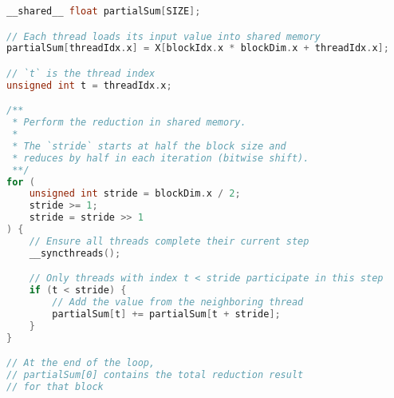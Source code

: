 \begin{lstlisting}[language=c++]
__shared__ float partialSum[SIZE];

// Each thread loads its input value into shared memory
partialSum[threadIdx.x] = X[blockIdx.x * blockDim.x + threadIdx.x];

// `t` is the thread index
unsigned int t = threadIdx.x;

/**
 * Perform the reduction in shared memory.
 *
 * The `stride` starts at half the block size and
 * reduces by half in each iteration (bitwise shift).
 **/
for (
    unsigned int stride = blockDim.x / 2;
    stride >= 1;
    stride = stride >> 1
) {
    // Ensure all threads complete their current step
    __syncthreads();

    // Only threads with index t < stride participate in this step
    if (t < stride) {
        // Add the value from the neighboring thread
        partialSum[t] += partialSum[t + stride];
    }
}

// At the end of the loop,
// partialSum[0] contains the total reduction result
// for that block
\end{lstlisting}